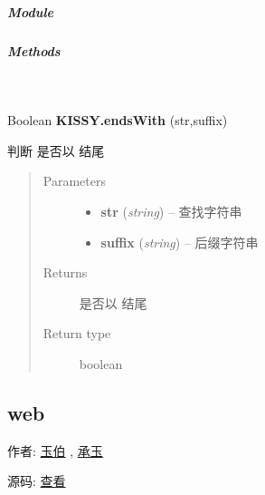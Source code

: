 \documentclass[letterpaper,10pt,english]{sphinxmanual}
\begin{document}
\subparagraph{Module}
\label{api/seed/lang/endsWith:module}\begin{quote}

{\hyperref[api/seed/lang/index:module-Lang]{}}
\end{quote}


\subparagraph{Methods}
\label{api/seed/lang/endsWith:methods}

\begin{fulllineitems}
\label{api/seed/lang/endsWith:Lang.KISSY.endsWith}~
\begin{DUlineblock}{0em}
\item[] Boolean \textbf{KISSY.endsWith} (str,suffix)
\item[] 判断  是否以  结尾
\end{DUlineblock}
\begin{quote}\begin{description}
\item[{Parameters}] \leavevmode\begin{itemize}
\item {}
\textbf{str} (\emph{string}) -- 查找字符串

\item {}
\textbf{suffix} (\emph{string}) -- 后缀字符串

\end{itemize}

\item[{Returns}] \leavevmode
{} 是否以  结尾

\item[{Return type}] \leavevmode
boolean

\end{description}\end{quote}

\end{fulllineitems}

\label{api/seed/web/index:module-Web}

\subsection{web}
\label{api/seed/web/index:web}\label{api/seed/web/index::doc}
\begin{DUlineblock}{0em}
\item[] 作者: \href{mailto:lifesinger@gmail.com}{玉伯} , \href{mailto:yiminghe@gmail.com}{承玉}
\item[] 源码: \href{https://github.com/kissyteam/kissy/tree/master/src/seed/web.js}{查看}
\end{DUlineblock}
\end{document}
